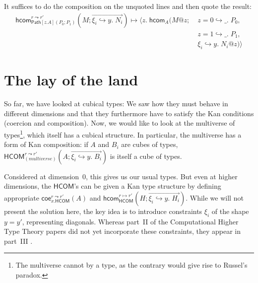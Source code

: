 \documentclass{article} \usepackage{chtt-notes} \usepackage{stmaryrd}
\newcommand{\hcom}{\mathsf{hcom}}
\newcommand{\coe}{\mathsf{coe}}
\newcommand{\hcomr}{(M; \overrightarrow{\xi_i \hookrightarrow y. \; N_i})}
\newcommand{\Path}{\mathsf{Path}}
\begin{document}
\begin{center}
\begin{minipage}{.2\textwidth}
\end{minipage}
\end{center}
It suffices to do the composition on the unquoted lines and then quote the result:
\begin{align*}
    \hcom_{\Path[z.A](P_0; P_1)}^{r \leadsto r'}\hcomr \mapsto \langle z. \; \hcom_A (M @ z;\;&z=0 \hookrightarrow \_. \; P_0, \\
    &z=1 \hookrightarrow \_. \; P_1, \\
    &\xi_i \hookrightarrow y. \; N_i @ z) \rangle
\end{align*}

\section{The lay of the land}
So far, we have looked at cubical types: We saw how they must behave in different dimensions and that they furthermore have to satisfy the Kan conditions (coercion and composition).
Now, we would like to look at the multiverse of types\footnote{The multiverse cannot by a type, as the contrary would give rise to Russel's paradox.}, which itself has a cubical structure.
In particular, the multiverse has a form of Kan composition: if $A$ and $B_i$ are cubes of types, $\mathsf{HCOM}_{\mathit{(multiverse)}}^{r \leadsto r'} (A; \overrightarrow{\xi_i \hookrightarrow y.\;B_i})$ is itself a cube of types.

Considered at dimension~0, this gives us our usual types. But even at higher dimensions, the $\mathsf{HCOM}$'s can be given a Kan type structure by defining appropriate $\coe_{x. \mathsf{HCOM}}^{r \leadsto r'}(A)$ and $\hcom_{\mathsf{HCOM}}^{r \mapsto r'}(H; \overrightarrow{\xi_i \hookrightarrow y. \; H_i})$.
While we will not present the solution here, the key idea is to introduce constraints $\xi_i$ of the shape $y = y'$, representing diagonals.
Whereas part~II of the Computational Higher Type Theory papers \citep{Angiuli:chtt2:16} did not yet incorporate these constraints, they appear in part~III \citep{Angiuli:chtt3:17}.
\end{document}
